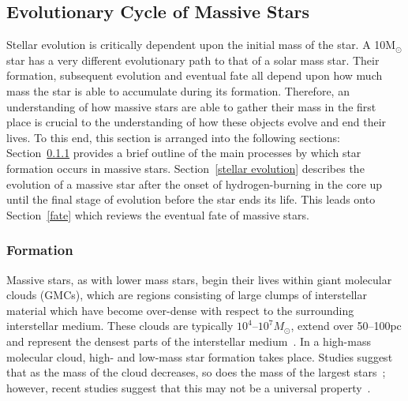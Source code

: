 \documentclass[a4paper,12pt]{article}
\begin{document}
\subsection{Evolutionary Cycle of Massive Stars}\label{cycle}

Stellar evolution is critically dependent upon the initial mass of the star. 
A 10M$_{\odot}$ star has a very different evolutionary path to that of a solar mass star.
Their formation, subsequent evolution and eventual fate all depend upon how much mass the star is able to accumulate during its formation. 
Therefore, an understanding of how massive stars are able to gather their mass in the first place is crucial to the understanding of how these objects evolve and end their lives.
To this end, this section is arranged into the following sections: Section~\ref{formation} provides a brief outline of the main processes by which star formation occurs in massive stars. 
Section~\ref{stellar evolution} describes the evolution of a massive star after the onset of hydrogen-burning in the core up until the final stage of evolution before the star ends its life.
This leads onto Section~\ref{fate} which reviews the eventual fate of massive stars.

\subsubsection{Formation}\label{formation}

Massive stars, as with lower mass stars, begin their lives within giant molecular clouds (GMCs), which are regions consisting of large clumps of interstellar material which have become over-dense with respect to the surrounding interstellar medium.
These clouds are typically $10^{4}$--$10^{7}M_{\odot}$, extend over 50--100pc and represent the densest parts of the interstellar medium~\citep{Fukui10}.
In a high-mass molecular cloud, high- and low-mass star formation takes place.
Studies suggest that as the mass of the cloud decreases, so does the mass of the largest stars~\citep{Fukui10,Weidner10}; however, recent studies suggest that this may not be a universal property~\citep[e.g.][]{Bressert12}.
\end{document}
